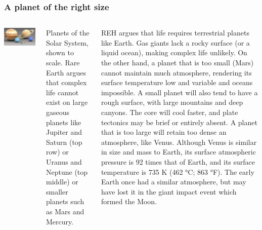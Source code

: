 \begin{frame}
\frametitle{A planet of the right size}

\begin{columns}

\includegraphics[scale=0.25]{planetsize}

Planets of the Solar System, shown to scale. Rare Earth argues that complex life cannot exist on large gaseous planets like Jupiter and Saturn (top row) or Uranus and Neptune (top middle) or smaller planets such as Mars and Mercury.

REH argues that life requires terrestrial planets like Earth. Gas giants lack a rocky surface (or a liquid ocean), making complex life unlikely. On the other hand,
a planet that is too small (Mars) cannot maintain much atmosphere, rendering its surface temperature low and variable and oceans impossible. A small planet will also tend to have a rough surface, with large mountains and deep canyons. The core will cool faster, and plate tectonics may be brief or entirely absent. A planet that is too large will retain too dense an atmosphere, like Venus. Although Venus is similar in size and mass to Earth, its surface atmospheric pressure is 92 times that of Earth, and its surface temperature is 735 K (462 °C; 863 °F). The early Earth once had a similar atmosphere, but may have lost it in the giant impact event which formed the Moon.

\end{columns}
\end{frame}

